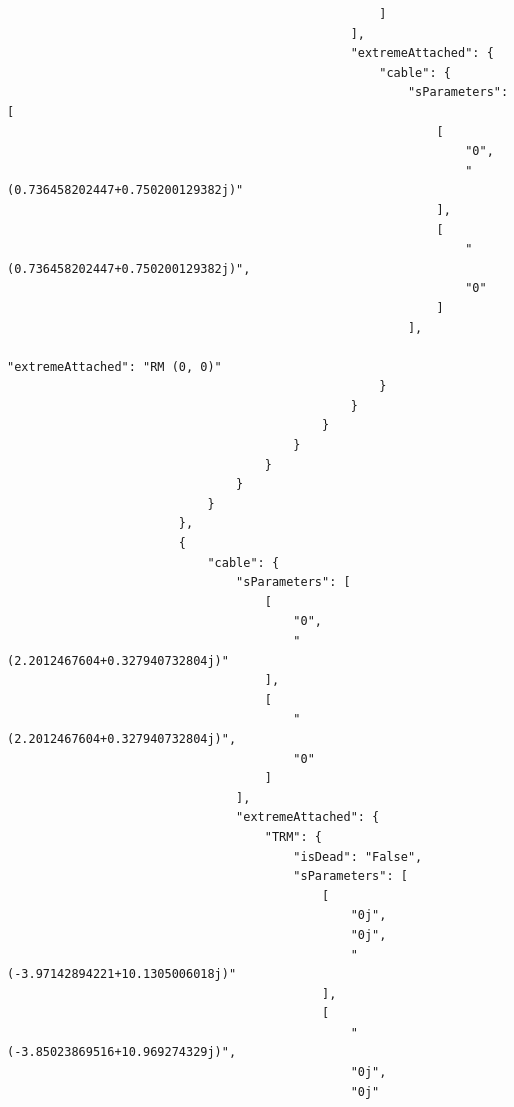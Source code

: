 \begin{verbatim}
                                                    ]
                                                ],
                                                "extremeAttached": {
                                                    "cable": {
                                                        "sParameters": [
                                                            [
                                                                "0",
                                                                "(0.736458202447+0.750200129382j)"
                                                            ],
                                                            [
                                                                "(0.736458202447+0.750200129382j)",
                                                                "0"
                                                            ]
                                                        ],
                                                        "extremeAttached": "RM (0, 0)"
                                                    }
                                                }
                                            }
                                        }
                                    }
                                }
                            }
                        },
                        {
                            "cable": {
                                "sParameters": [
                                    [
                                        "0",
                                        "(2.2012467604+0.327940732804j)"
                                    ],
                                    [
                                        "(2.2012467604+0.327940732804j)",
                                        "0"
                                    ]
                                ],
                                "extremeAttached": {
                                    "TRM": {
                                        "isDead": "False",
                                        "sParameters": [
                                            [
                                                "0j",
                                                "0j",
                                                "(-3.97142894221+10.1305006018j)"
                                            ],
                                            [
                                                "(-3.85023869516+10.969274329j)",
                                                "0j",
                                                "0j"

\end{verbatim}
